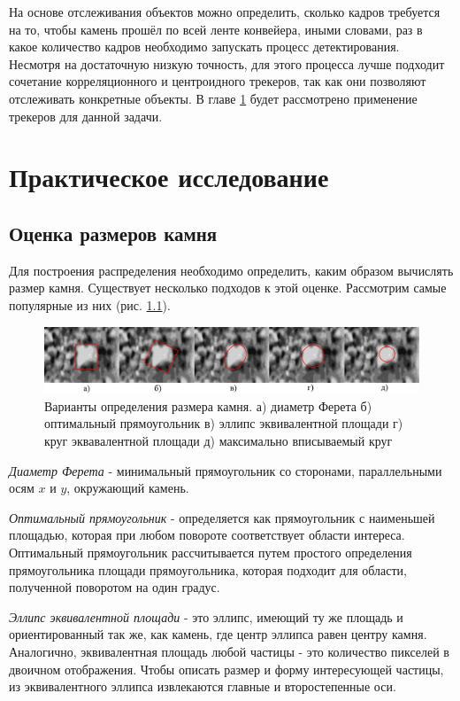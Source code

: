 \documentclass[times]{itmo-student-thesis}
\begin{document}
\chapterconclusion
На основе отслеживания объектов можно определить, сколько кадров требуется на то, чтобы камень прошёл по всей ленте конвейера, иными словами, раз в какое количество кадров необходимо запускать процесс детектирования. Несмотря на достаточную низкую точность, для этого процесса лучше подходит сочетание корреляционного и центроидного трекеров, так как они позволяют отслеживать конкретные объекты. В главе \ref{practic} будет рассмотрено применение трекеров для данной задачи. 

\chapter{Практическое исследование} \label{practic}
\section{Оценка размеров камня}
Для построения распределения необходимо определить, каким образом вычислять размер камня. Существует несколько подходов к этой оценке. Рассмотрим самые популярные из них (рис. \ref{fig:stones}). 
\begin{figure}
	\centering
	\includegraphics[width=1\linewidth]{images/stones}
	\caption{Варианты определения размера камня. а) диаметр Ферета б) оптимальный прямоугольник в) эллипс эквивалентной площади г) круг эквавалентной площади д) максимально вписываемый круг}
	\label{fig:stones}
\end{figure}

\textit{Диаметр Ферета} - минимальный прямоугольник со сторонами, параллельными осям $x$ и $y$, окружающий камень.

\textit{Оптимальный прямоугольник} - определяется как прямоугольник с наименьшей площадью, которая при любом повороте соответствует области интереса. Оптимальный прямоугольник рассчитывается путем простого определения прямоугольника площади прямоугольника, которая подходит для области, полученной поворотом на один градус.

\textit{Эллипс эквивалентной площади} - это эллипс, имеющий ту же площадь и ориентированный так же, как камень, где центр эллипса равен центру камня. Аналогично, эквивалентная площадь любой частицы - это количество пикселей в двоичном отображения. Чтобы описать размер и форму интересующей частицы, из эквивалентного эллипса извлекаются главные и второстепенные оси.
\end{document}
